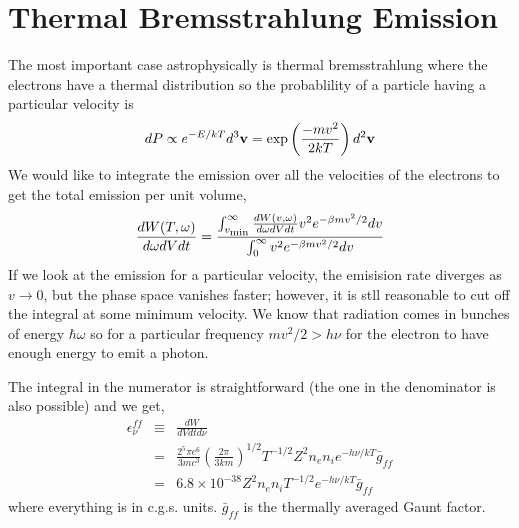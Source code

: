 \section{Thermal Bremsstrahlung Emission}
\label{sec:therm-bremsstr-emiss}
The most important case astrophysically is thermal bremsstrahlung
where the electrons have a thermal distribution so the probablility of
a particle having a particular velocity is
\begin{equation}
d P \propto e^{-E/kT} d^3 {\bf v} = \exp\left(\frac{-mv^2}{2 k T}
\right ) d^2 {\bf v}
\label{eq:339}
\end{equation}
We would like to integrate the emission over all the velocities of the
electrons to get the total emission per unit volume,
\begin{equation}
\frac{dW(T,\omega)}{d\omega dV dt} = \frac{\int_{v_{\hbox{\rm \scriptsize min}}}^\infty
  \frac{dW (v,\omega)}{d\omega d V dt} v^2 e^{-\beta m v^2/2} d v}
{\int_0^\infty v^2 e^{-\beta m v^2/2} d v}
\label{eq:340}
\end{equation}
If we look at the emission for a particular velocity, the emisision
rate diverges as $v \rightarrow 0$, but the phase space vanishes
faster; however, it is stll reasonable to cut off the integral
at some minimum velocity.  We know that radiation comes in bunches of
energy $\hbar \omega$ so for a particular frequency $mv^2/2 > h\nu$
for the electron to have enough energy to emit a photon.

The integral in the numerator is straightforward (the one in the
denominator is also possible) and we get,
\begin{eqnarray}
\epsilon_\nu^{ff} &\equiv& \frac{d W}{dV dt d\nu} \\
&=& \frac{2^5 \pi
  e^6}{3 m c^3} \left ( \frac{2\pi}{3km} \right )^{1/2} T^{-1/2} Z^2
  n_e n_i e^{-h\nu/kT} {\bar g}_{ff} \\
&=& 6.8 \times 10^{-38} Z^2 n_e n_i T^{-1/2} e^{-h\nu/kT} {\bar g}_{ff}
\label{eq:341}
\end{eqnarray}
where everything is in c.g.s. units.  ${\bar g}_{ff}$ is the thermally
averaged Gaunt factor.


